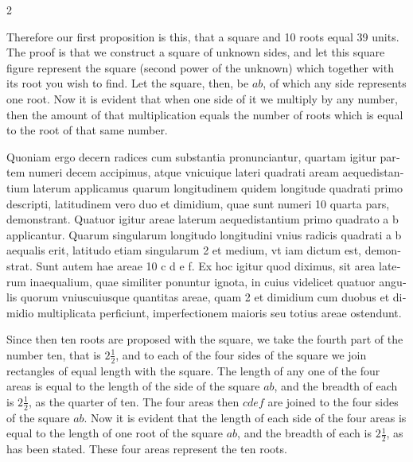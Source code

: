 \documentclass[11pt,a4paper,twoside]{book}
\newcommand{\latincolumn}[1]{\textlatin{\small #1}}
\begin{document}
\begin{paracol}{2}
\switchcolumn

Therefore our first proposition is this, that a square and 10 roots equal 39 units. The proof is that we construct a square of unknown sides, and let this square figure represent the square (second power of the unknown) which together with its root you wish to find. Let the square, then, be $ab$, of which any side represents one root. Now it is evident that when one side of it we multiply by any number, then the amount of that multiplication equals the number of roots which is equal to the root of that same number.

\switchcolumn*

\latincolumn{Quoniam ergo decern radices cum substantia pronunciantur, quartam igitur partem numeri decem accipimus, atque vnicuique lateri quadrati aream aequedistantium laterum applicamus quarum longitudinem quidem longitude quadrati primo descripti, latitudinem vero duo et dimidium, quae sunt numeri 10 quarta pars, demonstrant. Quatuor igitur areae laterum aequedistantium primo quadrato a b applicantur. Quarum singularum longitudo longitudini vnius radicis quadrati a b aequalis erit, latitudo etiam singularum 2 et medium, vt iam dictum est, demonstrat. Sunt autem hae areae 10 c d e f. Ex hoc igitur quod diximus, sit area laterum inaequalium, quae similiter ponuntur ignota, in cuius videlicet quatuor angulis quorum vniuscuiusque quantitas areae, quam 2 et dimidium cum duobus et dimidio multiplicata perficiunt, imperfectionem maioris seu totius areae ostendunt.}

\switchcolumn

Since then ten roots are proposed with the square, we take the fourth part of the number ten, that is $2\frac{1}{2}$, and to each of the four sides of the square we join rectangles of equal length with the square. The length of any one of the four areas is equal to the length of the side of the square $ab$, and the breadth of each is $2\frac{1}{2}$, as the quarter of ten. The four areas then $cdef$ are joined to the four sides of the square $ab$. Now it is evident that the length of each side of the four areas is equal to the length of one root of the square $ab$, and the breadth of each is $2\frac{1}{2}$, as has been stated. These four areas represent the ten roots.

\switchcolumn*


\end{paracol}
\end{document}
